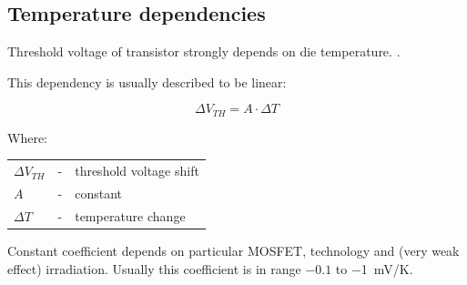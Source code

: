     \subsection{Temperature dependencies}
        Threshold voltage of transistor strongly depends on die temperature. \cite{managing_temperature_effects_in_nanoscale_adaptive_systems}.

        This dependency is usually described to be linear:

        $$\Delta V_{TH} = A \cdot \Delta T$$

        Where:

        \begin{tabular}{lcl}
            $\Delta V_{TH}$ & - & threshold voltage shift \\
            $A$ & - & constant \\
            $\Delta T$ & - & temperature change \\
        \end{tabular}
        \bigskip

        Constant coefficient depends on particular MOSFET, technology and (very weak effect) irradiation. Usually this coefficient is in range $-0.1$ to \SI{-1}{\milli\volt/\kelvin}.
